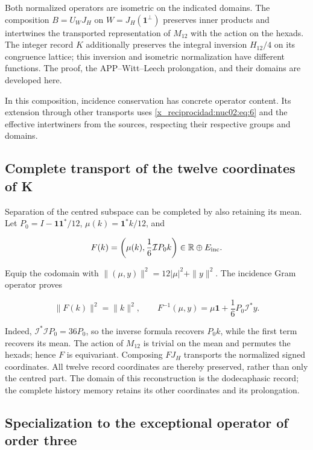 Both normalized operators are isometric on the indicated domains. The composition \(B=U_WJ_H\) on \(W=J_H(\mathbf1^\perp)\) preserves inner products and intertwines the transported representation of \(M_{12}\) with the action on the hexads. The integer record \(K\) additionally preserves the integral inversion \(H_{12}/4\) on its congruence lattice; this inversion and isometric normalization have different functions. The proof, the APP–Witt–Leech prolongation, and their domains are developed here.

In this composition, incidence conservation has concrete operator content. Its extension through other transports uses \eqref{x_reciprocidad:nuc02:eq:6} and the effective intertwiners from the sources, respecting their respective groups and domains.

\subsection{Complete transport of the twelve coordinates of K}

Separation of the centred subspace can be completed by also retaining its mean. Let \(P_0=I-\mathbf1\mathbf1^*/12\), \(\mu(k)=\mathbf1^*k/12\), and

\[
F(k)=\left(\mu(k),\frac16\mathcal I P_0k\right)\in\mathbb R\oplus E_{\rm inc}.
\]

Equip the codomain with \(\|(\mu,y)\|^2=12|\mu|^2+\|y\|^2\). The incidence Gram operator proves

\begin{equation}
\|F(k)\|^2=\|k\|^2,\qquad
\boxed{F^{-1}(\mu,y)=\mu\mathbf1+\frac16P_0\mathcal I^*y.}\label{x_reciprocidad:nuc02:eq:6a}
\end{equation}

Indeed, \(\mathcal I^*\mathcal I P_0=36P_0\), so the inverse formula recovers \(P_0k\), while the first term recovers its mean. The action of \(M_{12}\) is trivial on the mean and permutes the hexads; hence \(F\) is equivariant. Composing \(FJ_H\) transports the normalized signed coordinates. All twelve record coordinates are thereby preserved, rather than only the centred part. The domain of this reconstruction is the dodecaphasic record; the complete history memory retains its other coordinates and its prolongation.

\subsection{Specialization to the exceptional operator of order three}

